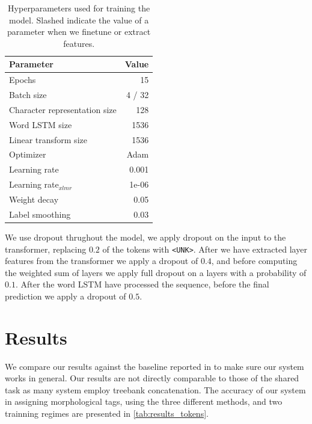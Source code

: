 \documentclass[11pt]{article}
\begin{document}
	\begin{table}[h]
		\centering
		\begin{tabular}{lr}
			Parameter & Value \\
			\hline
			Epochs & 15 \\
			Batch size & 4 / 32 \\
			Character representation size & 128 \\
            Word LSTM size & 1536 \\
            Linear transform size & 1536 \\
			Optimizer & Adam \\
			Learning rate & 0.001 \\
			Learning rate$_{xlmr}$ & 1e-06 \\
            Weight decay & 0.05 \\
			Label smoothing & 0.03 \\
		\end{tabular}
		\caption{\label{tab:parameters} Hyperparameters used for training the model. Slashed indicate the value of a parameter when we finetune or extract features.}
	\end{table}

        We use dropout thrughout the model, we apply dropout on the
     input to the transformer, replacing $0.2$ of the tokens with
     \texttt{<UNK>}. After we have extracted layer features from the
     transformer we apply a dropout of $0.4$, and before computing the
     weighted sum of layers we apply full dropout on a layers with a
     probability of $0.1$. After the word LSTM have processed the
     sequence, before the final prediction we apply a dropout of
     $0.5$.

	
	\section{Results}
	\label{results}

                We compare our results against the baseline reported
     in \cite{mccarthy2019sigmorphon} to make sure our system works in
     general. Our results are not directly comparable to those of the
     shared task as many system employ treebank concatenation.
        The accuracy of our system in assigning morphological tags,
     using the three different methods, and two trainning regimes are
     presented in \cref{tab:results_tokens}.
\end{document}
